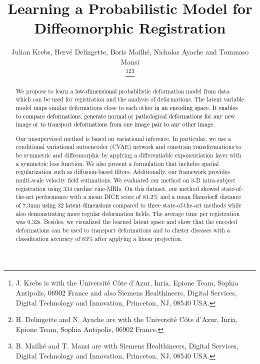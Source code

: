 \documentclass[journal]{IEEEtran}
\newcommand{\update}[1]{\textcolor{black}{#1}}
\begin{document}
\title{Learning a Probabilistic Model for \\ Diffeomorphic Registration}
\author{Julian Krebs, Herv\'{e} Delingette, Boris Mailh\'{e}, Nicholas Ayache and Tommaso Mansi

\thanks{J. Krebs is with the Universit\'{e} C\^{o}te d'Azur, Inria, Epione Team, Sophia Antipolis, 06902 France and also Siemens Healthineers, Digital Services, Digital Technology and Innovation, Princeton, NJ, 08540 USA.}\thanks{H. Delingette and N. Ayache are with the Universit\'{e} C\^{o}te d'Azur, Inria, Epione Team, Sophia Antipolis, 06902 France.}\thanks{B. Mailh\'{e} and T. Mansi are with Siemens Healthineers, Digital Services, Digital Technology and Innovation, Princeton, NJ, 08540 USA.}}





\maketitle

\begin{abstract}
We propose to learn a \update{low-dimensional} probabilistic deformation model from data which can be used for registration and the analysis of deformations. The latent variable model maps similar deformations close to each other \update{in an encoding space. It enables to compare deformations, generate normal or pathological deformations for any new image or to transport deformations from one image pair to any other image.}

Our unsupervised method is based on variational inference. In particular, we use a conditional variational autoencoder (CVAE) network and constrain transformations to be symmetric and diffeomorphic by applying a differentiable exponentiation layer with a symmetric loss function. We also present a formulation that includes spatial regularization such as diffusion-based filters. Additionally, our framework provides multi-scale velocity field estimations. 
We evaluated our method on 3-D intra-subject registration using 334 cardiac cine-MRIs. On this dataset, our method showed state-of-the-art performance with a mean DICE score of 81.2\% and a mean Hausdorff distance of 7.3mm \update{using 32 latent dimensions} compared to \update{three} state-of-the-art methods while also demonstrating more regular deformation fields. The average time per registration was 0.32s. Besides, we visualized the learned latent space and show that the encoded deformations can be used to transport deformations and to cluster diseases with a classification accuracy of 83\% after applying a linear projection.
\end{abstract}
\end{document}
